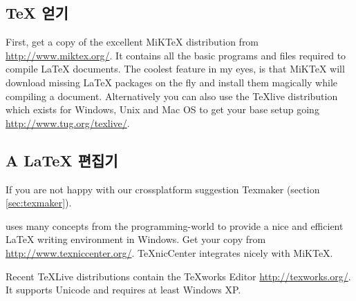 \subsection{\TeX{} 얻기}
First, get a copy of the excellent MiK\TeX{} distribution from\\
\url{http://www.miktex.org/}. It contains all the basic programs and files
required to compile \LaTeX{} documents.  The coolest feature in my eyes, is
that MiK\TeX{} will download missing \LaTeX{} packages on the fly and install them
magically while compiling a document. Alternatively you can also use
the TeXlive distribution which exists for Windows, Unix and Mac OS to
get your base setup going \url{http://www.tug.org/texlive/}.

\subsection{A \LaTeX{} 편집기}
If you are not happy with our crossplatform suggestion Texmaker (section \ref{sec:texmaker}).

 uses many concepts from the programming-world to provide a nice and
efficient \LaTeX{} writing environment in Windows. Get your copy from\\
\url{http://www.texniccenter.org/}. TeXnicCenter integrates nicely with
MiKTeX.

Recent \TeX Live distributions contain the \TeX{}works Editor
\url{http://texworks.org/}. It supports Unicode and requires at least Windows XP.

